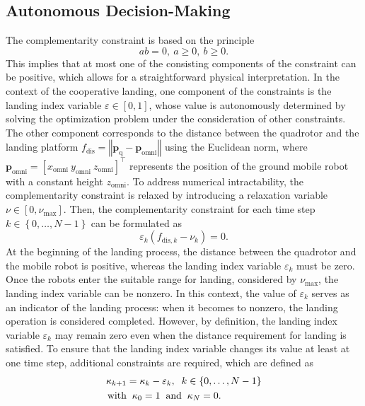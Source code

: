 \documentclass[conference,preprint]{IEEEtran}
\begin{document}
\subsection{Autonomous Decision-Making}

The complementarity constraint is based on the principle $$ab = 0,\ a \geq 0,\ b \geq 0.$$ This implies that at most one of the consisting components of the constraint can be positive, which allows for a straightforward physical interpretation. In the context of the cooperative landing, one component of the constraints is the landing index variable $\varepsilon \in \left[0, 1\right]$, whose value is autonomously determined by solving the optimization problem under the consideration of other constraints. The other component corresponds to the distance between the quadrotor and the landing platform $f_{\text{dis}}= \left\Vert \bm{p}_{\text{q}} - \bm{p}_{\text{omni}} \right\Vert$ using the Euclidean norm, where $\bm{p}_{\text{omni}}=\left[x_\text{omni}\ y_\text{omni}\ z_\text{omni}\right]^\top$ represents the position of the ground mobile robot with a constant height $ z_\text{omni}$. To address numerical intractability, the complementarity constraint is relaxed by introducing a relaxation variable $\nu \in \left[0, \nu_{\text{max}}\right]$. Then, the complementarity constraint for each time step $k \in \left\{0,\ldots,N-1\right\}$ can be formulated as
\begin{equation}
  \label{eq:complementarity}    
  \varepsilon_k \left(f_{\text{dis},k}-\nu_k \right) = 0.
\end{equation}
At the beginning of the landing process, the distance between the quadrotor and the mobile robot is positive, whereas the landing index variable $\varepsilon_k$ must be zero. Once the robots enter the suitable range for landing, considered by $\nu_\text{max}$, the landing index variable can be nonzero. In this context, the value of $\varepsilon_k$ serves as an indicator of the landing process: when it becomes to nonzero, the landing operation is considered completed.
However, by definition, the landing index variable $\varepsilon_k$ may remain zero even when the distance requirement for landing is satisfied. To ensure that the landing index variable changes its value at least at one time step, additional constraints are required, which are defined as
\begin{equation}
  \label{eq:additional_progress_condition}
  \begin{aligned}
    \kappa_{k+1} & = \kappa_{k} - \varepsilon_{k} , \hspace{2mm} k \in \{0, \ldots, N-1\}                          \\
    \text{with} & \hspace{2mm} \kappa_0 = 1\hspace{2mm}\text{and}\hspace{2mm} \kappa_N = 0.
  \end{aligned}
\end{equation}
\end{document}
